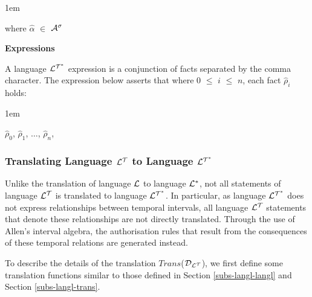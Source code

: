 \documentclass[11pt]{report}
\newenvironment{vquote}
{
  \begin{list}{}{\leftmargin 1em}\item[]
}
{
  \end{list}
}
\begin{document}
\begin{itemize}
\begin{vquote}
                where
                $\hat{\alpha}$ $\in$ ${\cal A}^{\sigma}$
              \end{vquote}

            \item
              {\bf Expressions}

              A language ${\cal L^{T^*}}$ expression is a conjunction of
              facts separated by the comma character. The expression below
              asserts that where $0$ $\leq$ $i$ $\leq$ $n$, each fact
              $\hat{\rho}_i$ holds:

              \begin{vquote}
                $\hat{\rho}_0$,
                $\hat{\rho}_1$,
                $\ldots$,
                $\hat{\rho}_n$,
              \end{vquote}

          \end{itemize}

        \subsubsection{Translating Language ${\cal L^T}$ to Language ${\cal L^{T^*}}$}

          Unlike the translation of language ${\cal L}$ to language
          ${\cal L^*}$, not all statements of language ${\cal L^T}$ is
          translated to language ${\cal L^{T^*}}$. In particular, as language
          ${\cal L^{T^*}}$ does not express relationships between temporal
          intervals, all language ${\cal L^T}$ statements that denote these
          relationships are not directly translated. Through the use of Allen's
          interval algebra, the authorisation rules that result from the
          consequences of these temporal relations are generated instead.

          To describe the details of the translation $Trans$(${\cal D_{L^T}}$),
          we first define some translation functions similar to those defined
          in Section \ref{subs-langl-langl} and Section \ref{subs-langl-trans}.
\end{document}
